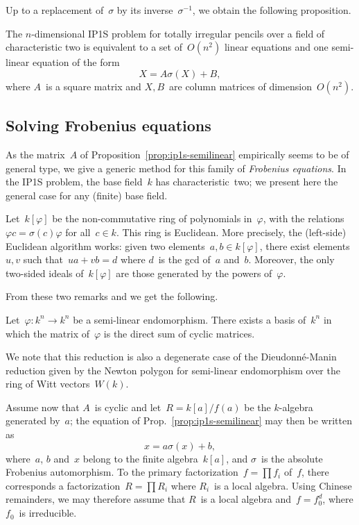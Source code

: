 \documentclass{article}%
\begin{document}
Up to a replacement of~$σ$ by its inverse~$σ^{-1}$, we obtain the
following proposition.

\begin{prop}\label{prop:ip1s-semilinear}%
The $n$-dimensional IP1S problem for totally irregular pencils over a
field of characteristic two is equivalent to a set of~$O(n^2)$ linear
equations and one semi-linear equation of the form
\begin{equation*}
X = A σ(X) + B,
\end{equation*}
where $A$~is a square matrix and $X, B$~are column matrices of
dimension~$O(n^2)$.
\end{prop}%

\subsection{Solving Frobenius equations}%

As the matrix~$A$ of Proposition~\ref{prop:ip1s-semilinear}
empirically seems to be of general type,
we give a generic method for this family of \emph{Frobenius equations}.
In the IP1S problem, the base field~$k$ has characteristic~two; we
present here the general case for any (finite) base field.

Let~$k[φ]$ be the non-commutative ring of polynomials in~$φ$,
with the relations~$φ c = σ(c) φ$ for all~$c ∈ k$. This ring is Euclidean.
More precisely, the (left-side) Euclidean algorithm works:
given two elements~$a, b ∈ k[φ]$, there exist elements~$u, v$
such that~$u a + v b = d$ where $d$~is the gcd of~$a$ and~$b$.
Moreover, the only two-sided ideals of~$k[φ]$
are those generated by the powers of~$φ$.

From these two remarks and \cite[Ch.~3, Th.~19]{jacobson1943rings} we get
the following.
\begin{thm}
Let~$φ: k^n → k^n$ be a semi-linear endomorphism. There exists a basis
of~$k^n$ in which the matrix of~$φ$ is the direct sum of cyclic matrices.
\end{thm}
We note that this reduction is also a degenerate case of
the Dieudonné-Manin reduction given by the Newton polygon
for semi-linear endomorphism over the ring of Witt vectors~$W(k)$.


Assume now that $A$~is cyclic and let~$R = k[a]/f(a)$ be the $k$-algebra
generated by~$a$; the equation of Prop.~\eqref{prop:ip1s-semilinear} may
then be written as
\begin{equation}\label{eq:semi-linear-pol}
x = a σ(x) + b,
\end{equation}
where~$a$, $b$ and~$x$ belong to the finite algebra~$k[a]$, and $σ$~is
the absolute Frobenius automorphism. To the primary factorization~$f = ∏
f_i$ of~$f$, there corresponds a factorization~$R = ∏ R_i$ where $R_i$~is
a local algebra. Using Chinese remainders, we may therefore assume that
$R$~is a local algebra and~$f = f_0^d$, where $f_0$~is irreducible.
\end{document}
